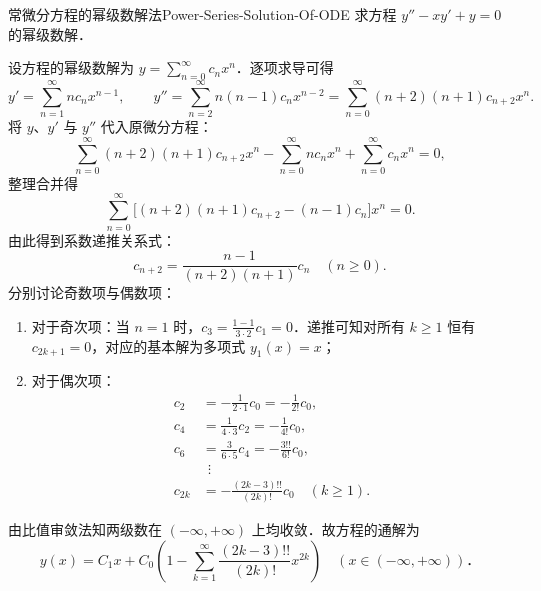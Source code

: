 \begin{problem}{常微分方程的幂级数解法}{Power-Series-Solution-Of-ODE}
    求方程 $y'' - xy' + y = 0$ 的幂级数解．
\end{problem}

\begin{solution}
    设方程的幂级数解为 $y = \sum_{n=0}^\infty c_n x^n$．逐项求导可得
    \begin{equation}
        y' = \sum_{n=1}^\infty n c_n x^{n-1}, \qquad y'' = \sum_{n=2}^\infty n(n-1) c_n x^{n-2} = \sum_{n=0}^\infty (n+2)(n+1) c_{n+2} x^n.
    \end{equation}
    将 $y$、$y'$ 与 $y''$ 代入原微分方程：
    \begin{equation}
        \sum_{n=0}^\infty (n+2)(n+1) c_{n+2} x^n - \sum_{n=0}^\infty n c_n x^n + \sum_{n=0}^\infty c_n x^n = 0,
    \end{equation}
    整理合并得
    \begin{equation}
        \sum_{n=0}^\infty \bigl[ (n+2)(n+1) c_{n+2} - (n-1) c_n \bigr] x^n = 0.
    \end{equation}
    由此得到系数递推关系式：
    \begin{equation}
        c_{n+2} = \frac{n-1}{(n+2)(n+1)} c_n \quad (n \geqslant 0).
    \end{equation}
    分别讨论奇数项与偶数项：
    \begin{enumerate}
        \item 对于奇次项：当 $n = 1$ 时，$c_3 = \frac{1-1}{3 \cdot 2} c_1 = 0$．递推可知对所有 $k \geqslant 1$ 恒有 $c_{2k+1} = 0$，对应的基本解为多项式 $y_1(x) = x$；
        \item 对于偶次项：
              \begin{equation}
                  \begin{aligned}
                      c_2    & = -\frac{1}{2 \cdot 1} c_0 = -\frac{1}{2!} c_0,      \\
                      c_4    & = \frac{1}{4 \cdot 3} c_2 = -\frac{1}{4!} c_0,       \\
                      c_6    & = \frac{3}{6 \cdot 5} c_4 = -\frac{3!!}{6!} c_0,     \\
                             & \ \ \vdots                                           \\
                      c_{2k} & = -\frac{(2k-3)!!}{(2k)!} c_0 \quad (k \geqslant 1).
                  \end{aligned}
              \end{equation}
    \end{enumerate}
    由比值审敛法知两级数在 $(-\infty, +\infty)$ 上均收敛．故方程的通解为
    \begin{equation}
        \boxed{y(x) = C_1 x + C_0 \left( 1 - \sum_{k=1}^\infty \frac{(2k-3)!!}{(2k)!} x^{2k} \right) \quad (x \in (-\infty, +\infty))．}
    \end{equation}
\end{solution}

